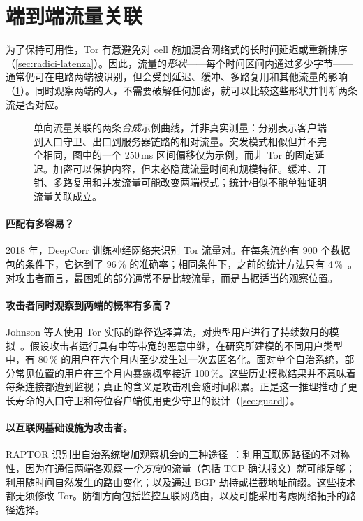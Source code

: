 \section{端到端流量关联}\label{sec:att-correlazione}

为了保持可用性，Tor 有意避免对 cell 施加混合网络式的长时间延迟或重新排序（\cref{sec:radici-latenza}）。因此，流量的\emph{形状}——每个时间区间内通过多少字节——通常仍可在电路两端被识别，但会受到延迟、缓冲、多路复用和其他流量的影响（\cref{fig:correlazione}）。同时观察两端的人，不需要破解任何加密，就可以比较这些形状并判断两条流是否对应。

\begin{figure}[htbp]
\centering

\caption{单向流量关联的两条\emph{合成}示例曲线，并非真实测量：分别表示客户端到入口守卫、出口到服务器链路的相对流量。突发模式相似但并不完全相同，图中的一个 250\,ms 区间偏移仅为示例，而非 Tor 的固定延迟。加密可以保护内容，但未必隐藏流量时间和规模特征。缓冲、开销、多路复用和并发流量可能改变两端模式；统计相似不能单独证明流量关联成立。}
\label{fig:correlazione}
\end{figure}

\paragraph{匹配有多容易？}2018 年，DeepCorr 训练神经网络来识别 Tor 流量对。在每条流约有 900 个数据包的条件下，它达到了 96\,\% 的准确率；相同条件下，之前的统计方法只有 4\,\%~\cite{nasr2018deepcorr}。对攻击者而言，最困难的部分通常不是比较流量，而是占据适当的观察位置。

\paragraph{攻击者同时观察到两端的概率有多高？}Johnson 等人使用 Tor 实际的路径选择算法，对典型用户进行了持续数月的模拟~\cite{johnson2013users}。假设攻击者运行具有中等带宽的恶意中继，在研究所建模的不同用户类型中，有 80\,\% 的用户在六个月内至少发生过一次去匿名化。面对单个自治系统，部分常见位置的用户在三个月内暴露概率接近 100\,\%。这些历史模拟结果并不意味着每条连接都遭到监视；真正的含义是攻击机会随时间积累。正是这一推理推动了更长寿命的入口守卫和每位客户端使用更少守卫的设计（\cref{sec:guard}）。

\paragraph{以互联网基础设施为攻击者。}RAPTOR 识别出自治系统增加观察机会的三种途径~\cite{sun2015raptor}：利用互联网路径的不对称性，因为在通信两端各观察\emph{一个方向}的流量（包括 TCP 确认报文）就可能足够；利用随时间自然发生的路由变化；以及通过 BGP 劫持或拦截地址前缀。这些技术都无须修改 Tor。防御方向包括监控互联网路由，以及可能采用考虑网络拓扑的路径选择。

